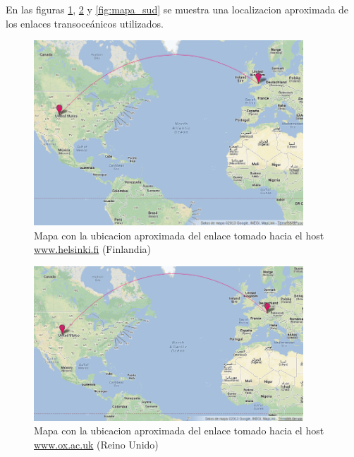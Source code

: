 En las figuras \ref{fig:mapa_fin}, \ref{fig:mapa_ing} y \ref{fig:mapa_sud} se muestra una localizacion aproximada de los enlaces transoceánicos utilizados.\\

\begin{figure}[H]
  \centering
    \includegraphics[width=0.9\textwidth]{imgs/finlandia_enlace_1.png}
    \caption{Mapa con la ubicacion aproximada del enlace tomado hacia el host \url{www.helsinki.fi} (Finlandia)}
    \label{fig:mapa_fin}
\end{figure}    

\begin{figure}[H]
  \centering
    \includegraphics[width=0.9\textwidth]{imgs/inglaterra_enlace_1.png}
    \caption{Mapa con la ubicacion aproximada del enlace tomado hacia el host \url{www.ox.ac.uk} (Reino Unido)}
    \label{fig:mapa_ing}
\end{figure}


